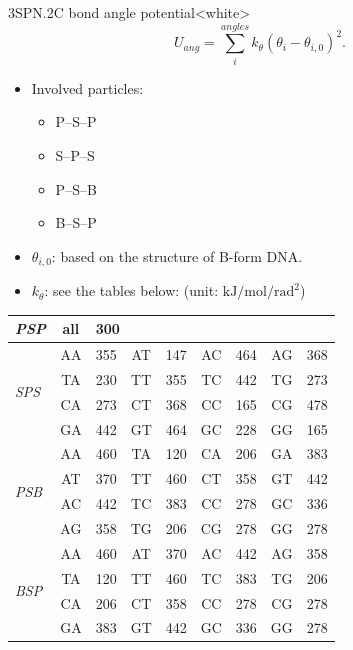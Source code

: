 \begin{smallpage}{3SPN.2C bond angle potential}<white>
  \begin{equation}
    \label{eq:dna_3spn2c_local_angle}
    U_{ang} = \sum_{i}^{angles} k_\theta (\theta_i - \theta_{i,0})^2.
  \end{equation}
  \tcblower
  \begin{itemize}
  \item Involved particles:
    \begin{itemize}
    \item P--S--P
    \item S--P--S
    \item P--S--B
    \item B--S--P
    \end{itemize}
  \item $\theta_{i, 0}$: based on the structure of B-form DNA.
  \item $k_\theta$: see the tables below: (unit: $\mathrm{kJ/mol/rad^2}$)
  \end{itemize}
  \begin{center}
    \begin{tabular}{l|cl|cl|cl|cl}
      \toprule
      \emph{PSP} & all & \multicolumn{7}{l}{300}\\
      \midrule
      \multirow{4}{*}{\emph{SPS}} &
                                    AA & 355 & AT & 147 & AC & 464 & AG & 368 \\
                 & TA & 230 & TT & 355 & TC & 442 & TG & 273 \\
                 & CA & 273 & CT & 368 & CC & 165 & CG & 478 \\
                 & GA & 442 & GT & 464 & GC & 228 & GG & 165 \\
      \midrule
      \multirow{4}{*}{\emph{PSB}} &
                                    AA & 460 & TA & 120 & CA & 206 & GA & 383 \\
                 & AT & 370 & TT & 460 & CT & 358 & GT & 442 \\
                 & AC & 442 & TC & 383 & CC & 278 & GC & 336 \\
                 & AG & 358 & TG & 206 & CG & 278 & GG & 278 \\
      \midrule
      \multirow{4}{*}{\emph{BSP}} &
                                    AA & 460 & AT & 370 & AC & 442 & AG & 358 \\
                 & TA & 120 & TT & 460 & TC & 383 & TG & 206 \\
                 & CA & 206 & CT & 358 & CC & 278 & CG & 278 \\
                 & GA & 383 & GT & 442 & GC & 336 & GG & 278 \\
      \bottomrule
    \end{tabular}
  \end{center}
\end{smallpage}

